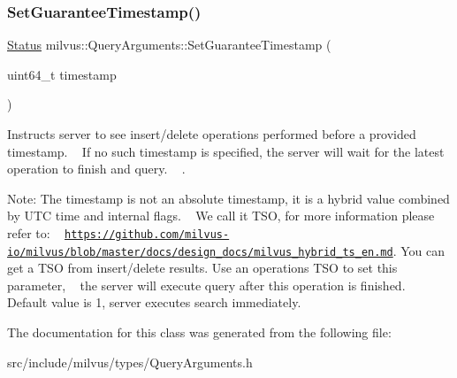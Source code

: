 \subsubsection{\texorpdfstring{Set\+Guarantee\+Timestamp()}{SetGuaranteeTimestamp()}}
{\footnotesize\ttfamily \hyperlink{classmilvus_1_1_status}{Status} milvus\+::\+Query\+Arguments\+::\+Set\+Guarantee\+Timestamp (\begin{DoxyParamCaption}\item[{uint64\+\_\+t}]{timestamp }\end{DoxyParamCaption})\hspace{0.3cm}{\ttfamily [inline]}}



Instructs server to see insert/delete operations performed before a provided timestamp. ~\newline
If no such timestamp is specified, the server will wait for the latest operation to finish and query. ~\newline
. 

Note\+: The timestamp is not an absolute timestamp, it is a hybrid value combined by U\+TC time and internal flags. ~\newline
 We call it T\+SO, for more information please refer to\+: ~\newline
\href{https://github.com/milvus-io/milvus/blob/master/docs/design_docs/milvus_hybrid_ts_en.md}{\tt https\+://github.\+com/milvus-\/io/milvus/blob/master/docs/design\+\_\+docs/milvus\+\_\+hybrid\+\_\+ts\+\_\+en.\+md}. You can get a T\+SO from insert/delete results. Use an operation\textquotesingle{}s T\+SO to set this parameter, ~\newline
 the server will execute query after this operation is finished. ~\newline
 Default value is 1, server executes search immediately. 

The documentation for this class was generated from the following file\+:\begin{DoxyCompactItemize}
\item 
src/include/milvus/types/Query\+Arguments.\+h\end{DoxyCompactItemize}
